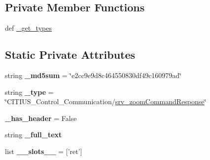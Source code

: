 \subsection*{\-Private \-Member \-Functions}
\begin{DoxyCompactItemize}
\item 
def \hyperlink{class_c_i_t_i_u_s___control___communication_1_1srv_1_1__srv__zoom_command_1_1srv__zoom_command_response_ace81d71b61ee8b63877e0d52a691d9cd}{\-\_\-get\-\_\-types}
\end{DoxyCompactItemize}
\subsection*{\-Static \-Private \-Attributes}
\begin{DoxyCompactItemize}
\item 
\hypertarget{class_c_i_t_i_u_s___control___communication_1_1srv_1_1__srv__zoom_command_1_1srv__zoom_command_response_a159f5929633815cc695f4ebae7bf9731}{string {\bfseries \-\_\-md5sum} = \char`\"{}e2cc9e9d8c464550830df49c160979ad\char`\"{}}\label{class_c_i_t_i_u_s___control___communication_1_1srv_1_1__srv__zoom_command_1_1srv__zoom_command_response_a159f5929633815cc695f4ebae7bf9731}

\item 
\hypertarget{class_c_i_t_i_u_s___control___communication_1_1srv_1_1__srv__zoom_command_1_1srv__zoom_command_response_aacaa58cb86e667e77361e312a8f336d7}{string {\bfseries \-\_\-type} = \char`\"{}\-C\-I\-T\-I\-U\-S\-\_\-\-Control\-\_\-\-Communication/\hyperlink{class_c_i_t_i_u_s___control___communication_1_1srv_1_1__srv__zoom_command_1_1srv__zoom_command_response}{srv\-\_\-zoom\-Command\-Response}\char`\"{}}\label{class_c_i_t_i_u_s___control___communication_1_1srv_1_1__srv__zoom_command_1_1srv__zoom_command_response_aacaa58cb86e667e77361e312a8f336d7}

\item 
\hypertarget{class_c_i_t_i_u_s___control___communication_1_1srv_1_1__srv__zoom_command_1_1srv__zoom_command_response_a29d7058e4bc4acf8765c27cf0bbdd501}{{\bfseries \-\_\-has\-\_\-header} = \-False}\label{class_c_i_t_i_u_s___control___communication_1_1srv_1_1__srv__zoom_command_1_1srv__zoom_command_response_a29d7058e4bc4acf8765c27cf0bbdd501}

\item 
string {\bfseries \-\_\-full\-\_\-text}
\item 
\hypertarget{class_c_i_t_i_u_s___control___communication_1_1srv_1_1__srv__zoom_command_1_1srv__zoom_command_response_a1c4a08c8b06e55df22a3d368fcd9a9b8}{list {\bfseries \-\_\-\-\_\-slots\-\_\-\-\_\-} = \mbox{[}'ret'\mbox{]}}\label{class_c_i_t_i_u_s___control___communication_1_1srv_1_1__srv__zoom_command_1_1srv__zoom_command_response_a1c4a08c8b06e55df22a3d368fcd9a9b8}


\end{DoxyCompactItemize}
